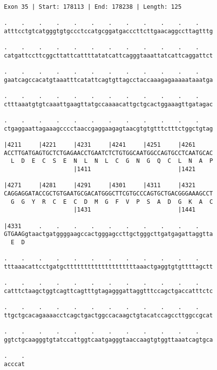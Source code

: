 \documentclass{article}
\begin{document}
\begin{Verbatim}[fontfamily=courier]
Exon 35 | Start: 178113 | End: 178238 | Length: 125

.    .    .    .    .    .    .    .    .    .    .    .    
atttcctgtcatgggtgtgccctccatgcggatgacccttcttgaacaggccttagtttg

.    .    .    .    .    .    .    .    .    .    .    .    
catgattccttcggcttattcattttatatcattcagggtaaattatcattcaggattct

.    .    .    .    .    .    .    .    .    .    .    .    
gaatcagccacatgtaaatttcatattcagtgttagcctaccaaagagaaaaataaatga

.    .    .    .    .    .    .    .    .    .    .    .    
ctttaaatgtgtcaaattgaagttatgccaaaacattgctgcactggaaagttgatagac

.    .    .    .    .    .    .    .    .    .    .    .    
ctgaggaattagaaagcccctaaccgaggaagagtaacgtgtgtttctttctggctgtag

|4211     |4221     |4231     |4241     |4251     |4261     
ACCTTGATGAGTGCTCTGAGAACCTGAATCTCTGTGGCAATGGCCAGTGCCTCAATGCAC
  L  D  E  C  S  E  N  L  N  L  C  G  N  G  Q  C  L  N  A  P
                    |1411                         |1421     

|4271     |4281     |4291     |4301     |4311     |4321     
CAGGAGGATACCGCTGTGAATGCGACATGGGCTTCGTGCCCAGTGCTGACGGGAAAGCCT
  G  G  Y  R  C  E  C  D  M  G  F  V  P  S  A  D  G  K  A  C
                    |1431                         |1441     

|4331     .    .    .    .    .    .    .    .    .    .    
GTGAAGgtaactgatggggaagccactgggagccttgctgggcttgatgagattaggtta
  E  D                                                      

.    .    .    .    .    .    .    .    .    .    .    .    
tttaaacattcctgatgcttttttttttttttttttttaaactgaggtgtgttttagctt

.    .    .    .    .    .    .    .    .    .    .    .    
catttctaagctggtcagttcagtttgtagagggattaggtttccagctgaccatttctc

.    .    .    .    .    .    .    .    .    .    .    .    
ttgctgcacagaaaacctcagctgactggccacaagctgtacatccagccttggccgcat

.    .    .    .    .    .    .    .    .    .    .    .    
ggtctgcaagggtgtatccattggtcaatgagggtaaccaagtgtggttaaatcagtgca

.    .
acccat
\end{Verbatim}
\newpage
\end{document}
